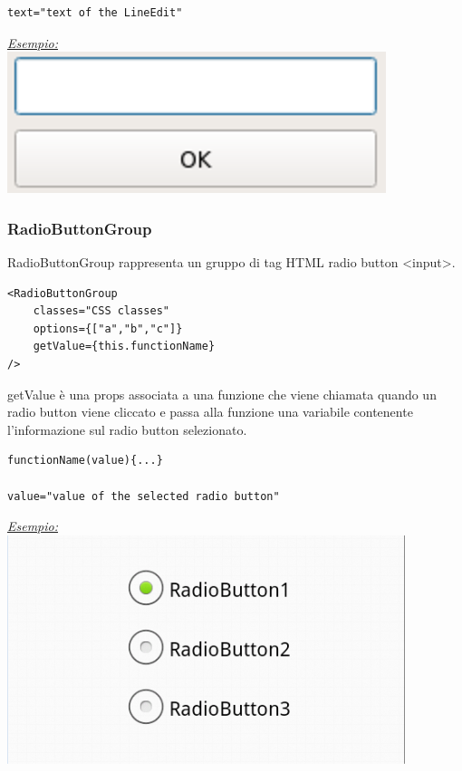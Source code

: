 \begin{flushleft}
\begin{verbatim}
text="text of the LineEdit"
\end{verbatim}

\begin{center}
\underline{\textit{Esempio:}}
\\
\includegraphics[scale=0.75]{img/LEPush.png}
\\
\end{center}

\subsubsection{RadioButtonGroup}
RadioButtonGroup rappresenta un gruppo di tag HTML radio button <input>.
\begin{verbatim}
<RadioButtonGroup
	classes="CSS classes"
	options={["a","b","c"]}
	getValue={this.functionName}
/>
\end{verbatim}
getValue è una props associata a una funzione che viene chiamata quando un radio button viene cliccato e passa alla funzione una variabile contenente l'informazione sul radio button selezionato.
\begin{verbatim}
functionName(value){...}

value="value of the selected radio button"
\end{verbatim}

\begin{center}
\underline{\textit{Esempio:}}
\\
\includegraphics[scale=0.6]{img/radiob.png}
\\
\end{center}


\end{flushleft}
